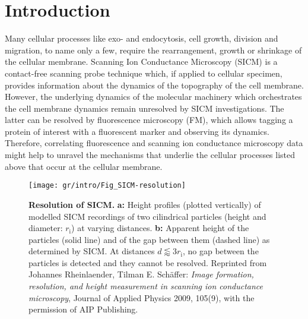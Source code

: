 \section{Introduction}
\label{sec:introduction}
Many cellular processes like exo- and endocytosis, cell growth, division and
migration, to name only a few, require the rearrangement, growth or shrinkage
of the cellular membrane. Scanning Ion Conductance Microscopy (SICM)
\cite{Hansma1989} is a contact-free scanning probe technique which, if applied
to cellular specimen, provides information about the dynamics of the
topography of the cell membrane. However, the underlying dynamics of the
molecular machinery which orchestrates the cell membrane dynamics remain
unresolved by SICM investigations. The latter can be resolved by fluorescence
microscopy (FM), which allows tagging a protein of interest with a fluorescent
marker and observing its dynamics. Therefore, correlating fluorescence and
scanning ion conductance microscopy data might help to unravel the mechanisms
that underlie the cellular processes listed above that occur at the cellular
membrane.

\begin{figure}[t]\centering
  \texttt{[image: gr/intro/Fig\_SICM-resolution]}
  \caption{\textbf{Resolution of SICM.}  \textbf{a:} Height profiles
    (plotted vertically) of modelled SICM recordings of two cilindrical
    particles (height and diameter: $r_\text{i}$) at varying
    distances. \textbf{b:} Apparent height of the particles (solid line) and of
    the gap between them (dashed line) as determined by SICM. At distances
    $d\lessapprox3r_\text{i}$, no gap between the particles is detected and
    they cannot be resolved.
    Reprinted from Johannes Rheinlaender, Tilman E. Schäffer: \emph{Image
      formation, resolution, and height measurement in scanning ion
      conductance microscopy}, Journal of Applied Physics 2009, 105(9), with
    the permission of AIP Publishing.  }
  \label{fig:sicm-resolution}
\end{figure}
  
